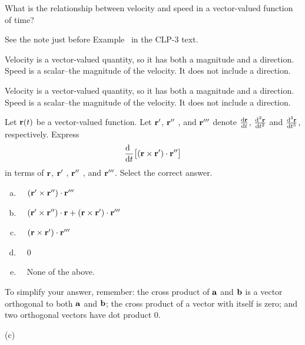 \begin{question}
What is the relationship between velocity and speed in a vector-valued function of time?
\end{question}
\begin{hint} See the note just before Example~
in the CLP-3 text.
\end{hint}
\begin{answer}
Velocity is a vector-valued quantity, so it has both a magnitude and a direction. Speed is a scalar--the magnitude of the velocity. It does not include a direction.
\end{answer}
\begin{solution}
Velocity is a vector-valued quantity, so it has both a magnitude and a direction. Speed is a scalar--the magnitude of the velocity. It does not include a direction.\end{solution}

\begin{question}[M317 2005D] %
Let $\mathbf{r}(t)$ be a vector-valued function. Let $\mathbf{r}'$, $\mathbf{r}''$ , and $\mathbf{r}'''$ 
denote $\diff{\vr}{t}$, $\difftwo{\vr}{t}$ and 
$\frac{\mathrm{d^3}\hfil\vr\hfil}{\mathrm{d}{t}^3}$, respectively.
Express
\begin{equation*}
\diff{\hfill}{t}\big[ (\vr \times \vr')\cdot\vr'' \big]
\end{equation*}
in terms of $\mathbf{r}$, $\mathbf{r}'$ , $\mathbf{r}''$ , and $\mathbf{r}'''$. 
Select the correct answer.
\begin{enumerate}[(a)]
\item\ \  $(\mathbf{r}'\times\mathbf{r}'' )\cdot\mathbf{r}'''$
\item\ \  $(\mathbf{r}'\times\mathbf{r}'' )\cdot\mathbf{r} + (\mathbf{r}\times\mathbf{r}' )\cdot\mathbf{r}'''$
\item\ \  $(\mathbf{r}\times\mathbf{r}' )\cdot\mathbf{r}'''$
\item\ \  $0$
\item\ \  None of the above.
\end{enumerate}
\end{question}

\begin{hint} 
To simplify your answer, remember: the cross product of $\mathbf{a}$ and $\mathbf{b}$ is a vector orthogonal to both $\mathbf{a}$ and $\mathbf{b}$; the cross product of a vector with itself is zero; and two orthogonal vectors have dot product 0.
\end{hint}

\begin{answer} 
(c)
\end{answer}

